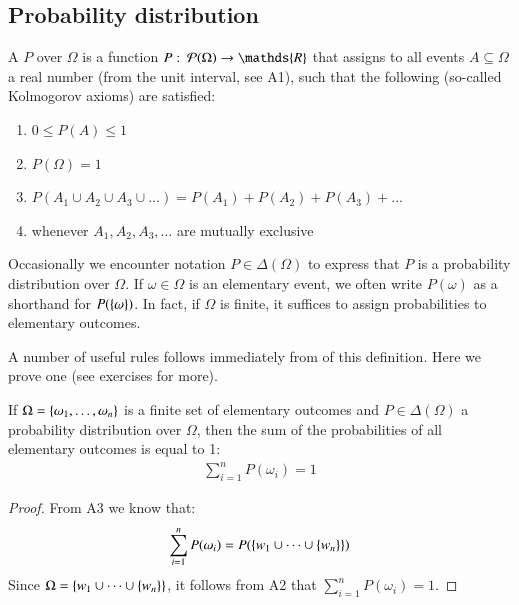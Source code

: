 \documentclass[nobib,nofonts]{tufte-handout}
\begin{document}
\subsection{Probability distribution}

A  $P$ over $\Omega$ is a function
$P \mycolon \pow{\Omega} \rightarrow \mathds{R}$ that assigns to all events
$A \subseteq \Omega$ a real number (from the unit interval, see A1), such that the following
(so-called Kolmogorov axioms) are satisfied:
\begin{enumerate}[{A}1.]
\item $0 \le P(A) \le 1$
\item $P(\Omega) = 1$
\item $P(A_1 \cup A_2 \cup A_3 \cup \dots) = P(A_1) + P(A_2) + P(A_3) + \dots $
\item[] whenever $A_1, A_2, A_3, \dots$ are mutually exclusive
\end{enumerate}
Occasionally we encounter notation $P \in \Delta(\Omega)$ to express that $P$ is a probability
distribution over $\Omega$. If $\omega \in \Omega$ is an elementary event,
we often write $P(\omega)$ as a shorthand for $P(\left\{\omega\right\})$. In fact, if $\Omega$ is
finite, it suffices to assign probabilities to elementary outcomes.

A number of useful rules follows immediately from of this definition.
Here we prove one (see exercises for more).

\begin{claim}
  \label{theorem:sum-of-elementary-outcomes}
  If $\Omega = \left\{\omega_{1}, \dots, \omega_{n}\right\}$ is a finite set of elementary outcomes and $P \in \Delta(\Omega)$ a probability distribution over $\Omega$, then the sum of the probabilities of all elementary outcomes is equal to 1:
  \begin{align*}
    \sum_{i = 1}^{n} P(\omega_{i}) = 1
  \end{align*}
\end{claim}
\begin{proof}
  From A3 we know that:
  \begin{align*}
  \sum_{i = 1}^{n} P(\omega_{i}) = P(\left\{w_{1} \cup \dots \cup \left\{w_{n}\right\}\right\})
  \end{align*}
  Since $\Omega = \left\{w_{1} \cup \dots \cup \left\{w_{n}\right\}\right\}$, it follows from A2 that $\sum_{i = 1}^{n} P(\omega_{i}) = 1$.
\end{proof}
\end{document}
